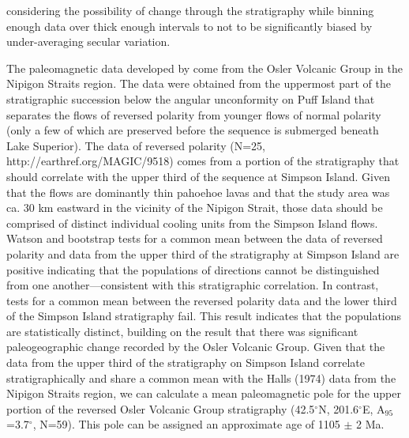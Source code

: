 \documentclass[draft,gc]{AGUTeX}
\begin{document}
\begin{article}
considering the possibility of change through the stratigraphy while binning enough data over thick enough intervals to not to be significantly biased by under-averaging secular variation.

The paleomagnetic data developed by \citet{Halls1974a} come from the Osler Volcanic Group in the Nipigon Straits region. The data were obtained from the uppermost part of the stratigraphic succession below the angular unconformity on Puff Island that separates the flows of reversed polarity from younger flows of normal polarity (only a few of which are preserved before the sequence is submerged beneath Lake Superior). The \citet{Halls1974a} data of reversed polarity (N=25,  http://earthref.org/MAGIC/9518) comes from a portion of the stratigraphy that should correlate with the upper third of the sequence at Simpson Island. Given that the flows are dominantly thin pahoehoe lavas and that the \citet{Hall1974a} study area was ca. 30 km eastward in the vicinity of the Nipigon Strait, those data should be comprised of distinct individual cooling units from the Simpson Island flows. Watson and bootstrap tests for a common mean between the \citet{Halls1974a} data of reversed polarity and data from the upper third of the stratigraphy at Simpson Island are positive indicating that the populations of directions cannot be distinguished from one another---consistent with this stratigraphic correlation. In contrast, tests for a common mean between the reversed polarity \citet{Halls1974a} data and the lower third of the Simpson Island stratigraphy fail. This result indicates that the populations are statistically distinct, building on the result that there was significant paleogeographic change recorded by the Osler Volcanic Group. Given that the data from the upper third of the stratigraphy on Simpson Island correlate stratigraphically and share a common mean with the Halls (1974) data from the Nipigon Straits region, we can calculate a mean paleomagnetic pole for the upper portion of the reversed Osler Volcanic Group stratigraphy (42.5$^\circ$N, 201.6$^\circ$E, A$_{95}$=3.7$^\circ$, N=59). This pole can be assigned an approximate age of 1105 $\pm$ 2 Ma.


\end{article}
\end{document}
